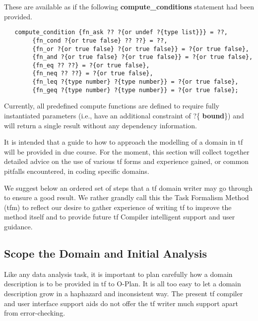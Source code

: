 These are available as if the following {\bf compute\_conditions}
 statement had been provided. 

\begin{verbatim}
   compute_condition {fn_ask ?? ?{or undef ?{type list}}} = ??,
        {fn_cond ?{or true false} ?? ??} = ??,
        {fn_or ?{or true false} ?{or true false}} = ?{or true false},
        {fn_and ?{or true false} ?{or true false}} = ?{or true false},
        {fn_eq ?? ??} = ?{or true false},
        {fn_neq ?? ??} = ?{or true false},
        {fn_leq ?{type number} ?{type number}} = ?{or true false},
        {fn_geq ?{type number} ?{type number}} = ?{or true false};
\end{verbatim}

Currently, all predefined compute functions are defined to require fully
instantiated parameters (i.e., have an additional constraint of ?\{{\bf
bound}\}) and will return a single result without any dependency information.


It is intended that a guide to how to approach the modelling of a domain in
{\sc tf} will be provided in due course.  For the moment, this section will
collect together detailed advice on the use of various {\sc tf} forms and
experience gained, or common pitfalls encountered, in coding specific domains.

We suggest below an ordered set of steps that a {\sc tf} domain writer may
go through to ensure a good result.  We rather grandly call this the Task
Formalism Method ({\sc tfm}) to reflect our desire to gather experience of
writing {\sc tf} to improve the method itself and to provide future {\sc tf}
Compiler intelligent support and user guidance.

\subsection{Scope the Domain and Initial Analysis}

Like any data analysis task, it is important to plan carefully how a domain
description is to be provided in {\sc tf} to O-Plan.  It is all too easy to
let a domain description grow in a haphazard and inconsistent way.  The
present {\sc tf} compiler and user interface support aids do not offer the
{\sc tf} writer much support apart from error-checking.

